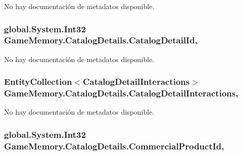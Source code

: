 No hay documentación de metadatos disponible. 

\hypertarget{class_game_memory_1_1_catalog_details_a29a305600ee6d70b918347bcd40a3c81}{
\subsubsection[{Catalog\-Detail\-Id}]{\setlength{\rightskip}{0pt plus 5cm}global.\-System.\-Int32 Game\-Memory.\-Catalog\-Details.\-Catalog\-Detail\-Id\hspace{0.3cm}{\ttfamily [get]}, {\ttfamily [set]}}}\label{class_game_memory_1_1_catalog_details_a29a305600ee6d70b918347bcd40a3c81}


No hay documentación de metadatos disponible. 

\hypertarget{class_game_memory_1_1_catalog_details_a19559e5bdd71c8487f22b4d9ad15822e}{
\subsubsection[{Catalog\-Detail\-Interactions}]{\setlength{\rightskip}{0pt plus 5cm}Entity\-Collection$<${\bf Catalog\-Detail\-Interactions}$>$ Game\-Memory.\-Catalog\-Details.\-Catalog\-Detail\-Interactions\hspace{0.3cm}{\ttfamily [get]}, {\ttfamily [set]}}}\label{class_game_memory_1_1_catalog_details_a19559e5bdd71c8487f22b4d9ad15822e}


No hay documentación de metadatos disponible. 

\hypertarget{class_game_memory_1_1_catalog_details_a18e97c03d1ac3af15e49bb0059ae3a2a}{
\subsubsection[{Commercial\-Product\-Id}]{\setlength{\rightskip}{0pt plus 5cm}global.\-System.\-Int32 Game\-Memory.\-Catalog\-Details.\-Commercial\-Product\-Id\hspace{0.3cm}{\ttfamily [get]}, {\ttfamily [set]}}}\label{class_game_memory_1_1_catalog_details_a18e97c03d1ac3af15e49bb0059ae3a2a}


